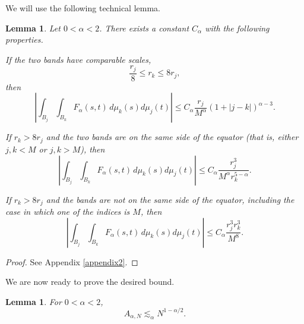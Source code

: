 \documentclass[11pt]{amsart}
\newtheorem{lemma}[theorem]{Lemma}
\begin{document}
We will use the following technical lemma.

\begin{lemma}\label{lem:blocks}
Let $0<\alpha<2$. There exists a constant $C_\alpha$ with the following properties.

If the two bands have comparable scales,
\[
 \frac{r_j}{8}\le r_k\le 8 r_j,
\]
then
\begin{equation}\label{eq:comparableblock}
 \left|
 \int_{B_j}\int_{B_k}F_\alpha(s,t)\,d\mu_k(s)d\mu_j(t)
 \right|
 \le C_\alpha\frac{r_j}{M^\alpha}
 (1+|j-k|)^{\alpha-3}.                               %
\end{equation}

If $r_k> 8 r_j$ and the two bands are on the same side of the equator
(that is, either $j,k<M$ or $j,k>M$), then
\begin{equation}\label{eq:farblock}
 \left|
 \int_{B_j}\int_{B_k}F_\alpha(s,t)\,d\mu_k(s)d\mu_j(t)
 \right|
 \le C_\alpha\frac{r_j^3}{M^\alpha r_k^{5-\alpha}}.
\end{equation}

If $r_k>8r_j$ and the bands are not on the same side
of the equator, including the case in which one of the indices is $M$,
then
\begin{equation}\label{eq:oppositeblock}
 \left|
 \int_{B_j}\int_{B_k}F_\alpha(s,t)\,d\mu_k(s)d\mu_j(t)
 \right|
 \le C_\alpha\frac{r_j^3r_k^3}{M^8}.                %
\end{equation}
\end{lemma}
\begin{proof}
    See Appendix \ref{appendix2}.
\end{proof}

We are now ready to prove the desired bound.
\begin{lemma}\label{lem:latitude}
For $0<\alpha<2$,
\[
 A_{\alpha,N}\lesssim_\alpha N^{1-\alpha/2}.
\]
\end{lemma}
\end{document}

